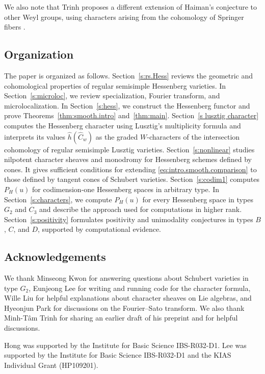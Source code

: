 \documentclass[11pt]{amsart}
\numberwithin{equation}{section}
\theoremstyle{definition}
\begin{document}
We also note that Trinh proposes a different extension of Haiman's conjecture to other Weyl groups, using characters arising from the cohomology of Springer fibers \cite[Conjecture~B]{trinh2026haimansconjecturespringersrepresentations}.


\subsection{Organization}
The paper is organized as follows.
Section~\ref{s:rs.Hess} reviews the geometric and cohomological properties of regular semisimple Hessenberg varieties.
In Section~\ref{s:microloc}, we review specialization, Fourier transform, and microlocalization.
In Section~\ref{s:hess}, we construct the Hessenberg functor and prove Theorems~\ref{thm:smooth.intro} and~\ref{thm:main}.
Section~\ref{s lusztig character} computes the Hessenberg character using Lusztig's multiplicity formula and interprets its values $\widehat h(\widehat C_w)$ as the graded $W$-characters of the intersection cohomology of regular semisimple Lusztig varieties.
Section~\ref{s:nonlinear} studies nilpotent character sheaves and monodromy for Hessenberg schemes defined by cones.
It gives sufficient conditions for extending \eqref{eq:intro.smooth.comparison} to those defined by tangent cones of Schubert varieties. 
Section~\ref{s:codim1} computes $P_H(u)$ for codimension-one Hessenberg spaces in arbitrary type.
In Section~\ref{s:characters}, we compute $P_H(u)$ for every Hessenberg space in types $G_2$ and $C_3$ and describe the approach used for computations in higher rank.
Section~\ref{s:positivity} formulates positivity and unimodality conjectures in types $B$, $C$, and $D$, supported by computational evidence.

\subsection*{Acknowledgements}
We thank Minseong Kwon for answering questions about Schubert varieties in type $G_2$, Eunjeong Lee for writing and running code for the character formula, Wille Liu for helpful explanations about character sheaves on Lie algebras, and Hyeonjun Park for discussions on the Fourier--Sato transform.
We also thank Minh-T\^am Trinh for sharing an earlier draft of his preprint \cite{trinh2026haimansconjecturespringersrepresentations} and for helpful discussions.

Hong was supported by the Institute for Basic Science IBS-R032-D1. 
Lee was supported by the Institute for Basic Science IBS-R032-D1 and the KIAS Individual Grant (HP109201).
\end{document}
